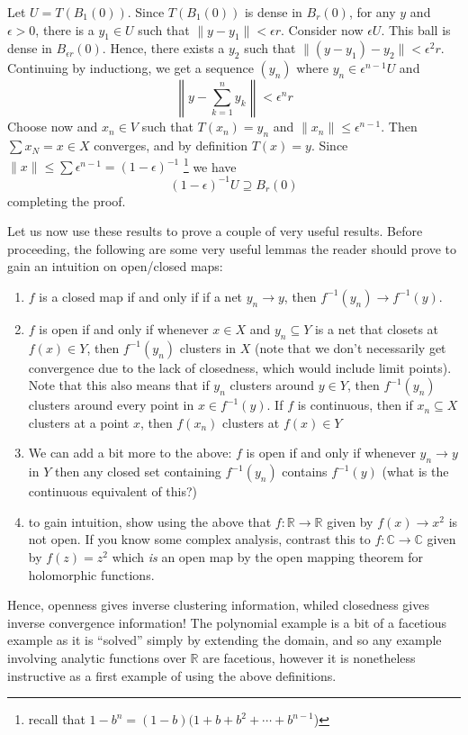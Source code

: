 \documentclass[oneside]{book}
\newcommand{\R}{\mathbb{R}}
\newcommand{\C}{\mathbb{C}}
\newcommand{\sse}{\subseteq}
\begin{document}
\begin{Proof}
	Let $U = T(B_1(0))$. Since $T(B_1(0))$ is dense in $B_r(0)$, for any $y$ and $\epsilon > 0$, there is a $y_1 \in
	U$ such that $\|y - y_1\| < \epsilon r$. Consider now $\epsilon U$. This ball is dense in $B_{\epsilon
	r}(0)$. Hence, there exists a $y_2$ such that $\|(y - y_1) - y_2\| < \epsilon^2 r$. Continuing by inductiong, we
	get a sequence $(y_n)$ where $y_n \in \epsilon^{n-1}U$ and
	\[
		\left\|y - \sum_{k=1}^n y_k\right\| < \epsilon^nr
	\]
	Choose now and $x_n \in V$ such that $T(x_n) = y_n$ and $\|x_n\| \le \epsilon^{n-1}$. Then $\sum x_N
	= x \in X$ converges, and by definition $T(x) = y$. Since $\|x\| \le \sum \epsilon^{n-1}
	= ( 1-\epsilon )^{-1}$ \footnote{recall that $1-b^n = (1-b)(1 + b + b^2 + \cdots + b^{n-1}$)}  we have
	\[
		(1-\epsilon)^{-1}U \supseteq B_r(0)
	\]
	completing the proof.
\end{Proof}

Let us now use these results to prove a couple of very useful results. Before proceeding, the following are
some very useful lemmas the reader should prove to gain an intuition on open/closed maps:
\begin{enumerate}
	\item $f$ is a closed map if and only if if a net $y_n \to y$, then $f^{-1}(y_n) \to f^{-1}(y)$.
	\item $f$ is open if and only if whenever $x \in X$ and $y_n\sse Y$ is a net that closets at $f(x) \in Y$,
		then $f^{-1}(y_n)$ clusters in $X$ (note that we don't necessarily get convergence due to the lack of
		closedness, which would include limit points). Note that this also means that if $y_n$ clusters around
		$y \in Y$, then $f^{-1}(y_n)$ clusters around every point in $x \in f^{-1}(y)$. If $f$ is continuous,
		then if $x_n \sse X$ clusters at a point $x$, then $f(x_n)$ clusters at $f(x) \in Y$
	\item We can add a bit more to the above: $f$ is open if and only if whenever $y_n \to y$ in $Y$ then any
		closed set containing $f^{-1}(y_n)$ contains $f^{-1}(y)$ (what is the continuous equivalent of this?)
	\item to gain intuition, show using the above that $f: \R \to \R$ given by $f(x) \to x^2$ is not open. If
		you know some complex analysis, contrast this to $f: \C \to \C$ given by $f(z) = z^2$ which \emph{is}
		an open map by the open mapping theorem for holomorphic functions.
\end{enumerate}

Hence, openness gives inverse clustering information, whiled closedness gives inverse convergence information!
The polynomial example is a bit of a facetious example as it is ``solved'' simply by extending the domain,
and so any example involving analytic functions over $\R$ are facetious, however it is nonetheless instructive
as a first example of using the above definitions.
\end{document}
